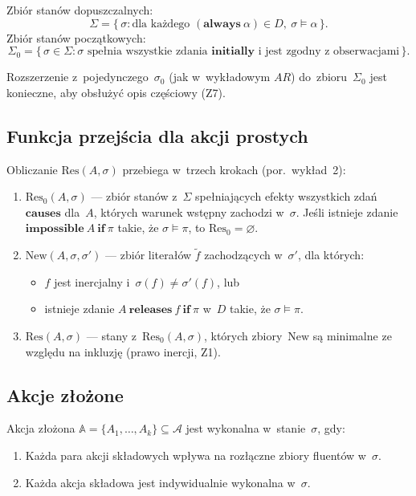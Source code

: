 \documentclass[11pt,a4paper]{article}
\newcommand{\causes}{\textbf{causes}}
\renewcommand{\iff}{\textbf{if}}
\newcommand{\initially}{\textbf{initially}}
\newcommand{\always}{\textbf{always}}
\newcommand{\impossible}{\textbf{impossible}}
\newcommand{\releases}{\textbf{releases}}
\newcommand{\Res}{\mathrm{Res}}
\newcommand{\New}{\mathrm{New}}
\newcommand{\Ac}{\mathcal{A}}
\begin{document}
Zbiór stanów dopuszczalnych:
\[
  \Sigma = \bigl\{\, \sigma : \text{dla każdego }
  (\always\ \alpha) \in D,\ \sigma \models \alpha \,\bigr\}.
\]
Zbiór stanów początkowych:
\[
  \Sigma_0 = \bigl\{\, \sigma \in \Sigma :
  \text{$\sigma$ spełnia wszystkie zdania } \initially
  \text{ i~jest zgodny z~obserwacjami} \,\bigr\}.
\]

Rozszerzenie z~pojedynczego~$\sigma_0$ (jak w~wykładowym $AR$) do~zbioru~$\Sigma_0$
jest konieczne, aby obsłużyć opis częściowy (Z7).

\subsection{Funkcja przejścia dla akcji prostych}

Obliczanie $\Res(A, \sigma)$ przebiega w~trzech krokach (por.\ wykład~2):

\begin{enumerate}
  \item $\Res_0(A, \sigma)$ --- zbiór stanów z~$\Sigma$
        spełniających efekty wszystkich zdań $\causes$ dla~$A$,
        których warunek wstępny zachodzi w~$\sigma$.
        Jeśli istnieje zdanie $\impossible\ A\ \iff\ \pi$
        takie, że $\sigma \models \pi$, to $\Res_0 = \varnothing$.

  \item $\New(A, \sigma, \sigma')$ --- zbiór literałów
        $\tilde{f}$ zachodzących w~$\sigma'$, dla których:
        \begin{itemize}
          \item $f$ jest inercjalny i~$\sigma(f) \neq \sigma'(f)$, lub
          \item istnieje zdanie $A\ \releases\ f\ \iff\ \pi$ w~$D$
                takie, że $\sigma \models \pi$.
        \end{itemize}

  \item $\Res(A, \sigma)$ --- stany z~$\Res_0(A, \sigma)$,
        których zbiory~$\New$ są minimalne ze względu na inkluzję
        (prawo inercji, Z1).
\end{enumerate}

\subsection{Akcje złożone}

Akcja złożona $\mathbb{A} = \{A_1, \ldots, A_k\} \subseteq \Ac$ jest
wykonalna w~stanie~$\sigma$, gdy:
\begin{enumerate}
  \item Każda para akcji składowych wpływa na rozłączne zbiory fluentów
        w~$\sigma$.
  \item Każda akcja składowa jest indywidualnie wykonalna w~$\sigma$.
\end{enumerate}
\end{document}
